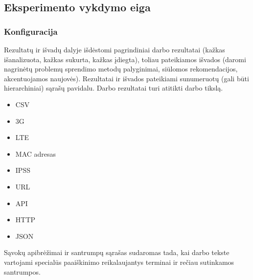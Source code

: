 \documentclass{VUMIFPSbakalaurinis}
\begin{document}
\subsection{Eksperimento vykdymo eiga}

\subsubsection{Konfiguracija}









Rezultatų ir išvadų dalyje išdėstomi pagrindiniai darbo rezultatai (kažkas
išanalizuota, kažkas sukurta, kažkas įdiegta), toliau pateikiamos išvados
(daromi nagrinėtų problemų sprendimo metodų palyginimai, siūlomos
rekomendacijos, akcentuojamos naujovės). Rezultatai ir išvados pateikiami
sunumeruotų (gali būti hierarchiniai) sąrašų pavidalu. Darbo rezultatai turi
atitikti darbo tikslą.

\printbibliography[heading=bibintoc]  %

\begin{itemize}
	\item CSV
	\item 3G
	\item LTE
	\item MAC adresas
	\item IPSS
	\item URL
	\item API
	\item HTTP
	\item JSON
\end{itemize}
Sąvokų apibrėžimai ir santrumpų sąrašas sudaromas tada, kai darbo tekste
vartojami specialūs paaiškinimo reikalaujantys terminai ir rečiau sutinkamos
santrumpos.

\appendix  %
\end{document}
